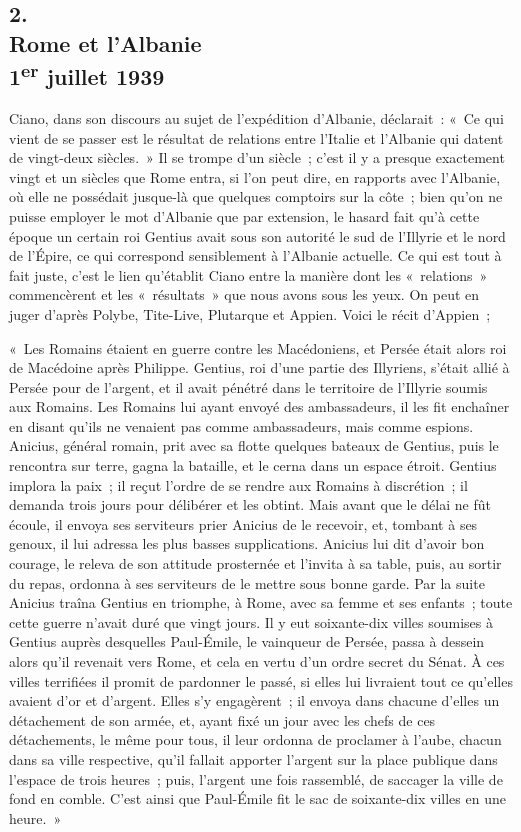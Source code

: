 \documentclass[french,twoside]{book} %
\begin{document}
\subsection[2. Rome et l’Albanie, 1er juillet 1939]{2. \\
Rome et l’Albanie \\
1\textsuperscript{er} juillet 1939}
\noindent \par
Ciano, dans son discours au sujet de l'expédition d'Albanie, déclarait : « Ce qui vient de se passer est le résultat de relations entre l'Italie et l'Albanie qui datent de vingt-deux siècles. » Il se trompe d'un siècle ; c'est il y a presque exactement vingt et un siècles que Rome entra, si l'on peut dire, en rapports avec l'Albanie, où elle ne possédait jusque-là que quelques comptoirs sur la côte ; bien qu'on ne puisse employer le mot d'Albanie que par extension, le hasard fait qu'à cette époque un certain roi Gentius avait sous son autorité le sud de l'Illyrie et le nord de l'Épire, ce qui correspond sensiblement à l'Albanie actuelle. Ce qui est tout à fait juste, c'est le lien qu'établit Ciano entre la manière dont les « relations » commencèrent et les « résultats » que nous avons sous les yeux. On peut en juger d'après Polybe, Tite-Live, Plutarque et Appien. Voici le récit d'Appien ;\par
« Les Romains étaient en guerre contre les Macédoniens, et Persée était alors roi de Macédoine après Philippe. Gentius, roi d'une partie des Illyriens, s'était allié à Persée pour de l'argent, et il avait pénétré dans le territoire de l'Illyrie soumis aux Romains. Les Romains lui ayant envoyé des ambassadeurs, il les fit enchaîner en disant qu'ils ne venaient pas comme ambassadeurs, mais comme espions. Anicius, général romain, prit avec sa flotte quelques bateaux de Gentius, puis le rencontra sur terre, gagna la bataille, et le cerna dans un espace étroit. Gentius implora la paix ; il reçut l'ordre de se rendre aux Romains à discrétion ; il demanda trois jours pour délibérer et les obtint. Mais avant que le délai ne fût écoule, il envoya ses serviteurs prier Anicius de le recevoir, et, tombant à ses genoux, il lui adressa les plus basses supplications. Anicius lui dit d'avoir bon courage, le releva de son attitude prosternée et l'invita à sa table, puis, au sortir du repas, ordonna à ses serviteurs de le mettre sous bonne garde. Par la suite Anicius traîna Gentius en triomphe, à Rome, avec sa femme et ses enfants ; toute cette guerre n'avait duré que vingt jours. Il y eut soixante-dix villes soumises à Gentius auprès desquelles Paul-Émile, le vainqueur de Persée, passa à dessein alors qu'il revenait vers Rome, et cela en vertu d'un ordre secret du Sénat. À ces villes terrifiées il promit de pardonner le passé, si elles lui livraient tout ce qu'elles avaient d'or et d'argent. Elles s'y engagèrent ; il envoya dans chacune d'elles un détachement de son armée, et, ayant fixé un jour avec les chefs de ces détachements, le même pour tous, il leur ordonna de proclamer à l'aube, chacun dans sa ville respective, qu'il fallait apporter l'argent sur la place publique dans l'espace de trois heures ; puis, l'argent une fois rassemblé, de saccager la ville de fond en comble. C'est ainsi que Paul-Émile fit le sac de soixante-dix villes en une heure. »\par
\end{document}
